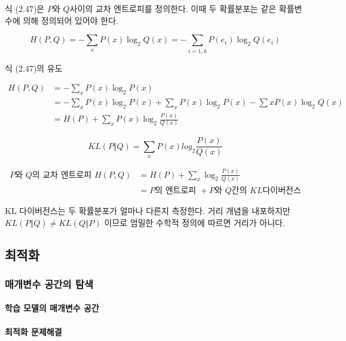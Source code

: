\documentclass [12pt] {oblivoir}
\let\oldsubsubsection=\subsubsection
\renewcommand{\subsubsection}
{
  \filbreak
  \oldsubsubsection
}
\begin{document}
식 (2.47)은 $P$와 $Q$사이의 교차 엔트로피를 정의한다. 이때 두 확률분포는 같은 확률변수에 의해 정의되어 있어야 한다.

\begin{equation} \tag{2.47}
  H(P, Q) = -\sum_{x}P(x)\log_{2}Q(x) = -\sum_{i=1,k}P(e_{i})\log_{2}Q(e_{i})
\end{equation}

식 (2.47)의 유도

\begin{align*}
  H(P, Q) &= -\sum_{x}P(x)\log_{2}P(x) \\
          &= -\sum_{x}P(x)\log_{2}P(x) + \sum_{x}P(x)\log_{2}P(x) - \sum{x}P(x)\log_{2}Q(x) \\
          &= H(P) + \sum_{x}P(x)\log_{2}\frac{P(x)}{Q(x)}
\end{align*}

\begin{equation} \tag{2.48}
  KL(P \Vert Q) = \sum_{x}P(x)log_{2}\frac{P(x)}{Q(x)}
\end{equation}

\begin{align} \tag{2.49}
  P\text{와 } Q\text{의 교차 엔트로피 } H(P, Q)
  &= H(P) + \sum_{x}\log_{2}\frac{P(x)}{Q(x)} \\
  &= P\text{의 엔트로피 } + P\text{와 } Q\text{간의 } KL\text{다이버전스}
\end{align}

KL 다이버전스는 두 확률분포가 얼마나 다른지 측정한다. 거리 개념을 내포하지만 $KL(P \Vert Q) \neq KL(Q \Vert P)$ 이므로 엄밀한 수학적 정의에 따르면 거리가 아니다.

\vspace{3mm}

\subsection{최적화}

\subsubsection{매개변수 공간의 탐색}

\paragraph*{학습 모델의 매개변수 공간}\mbox{}

\vspace{3mm}

\paragraph*{최적화 문제해결}\mbox{}
\end{document}

